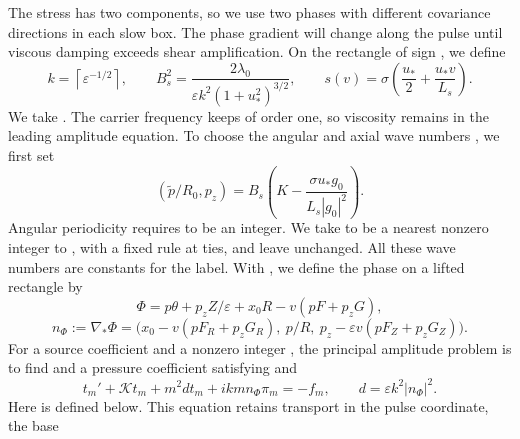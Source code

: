 The stress has two components, so we use two phases with different covariance directions
in each slow box. The phase gradient will change along the pulse until viscous damping
exceeds shear amplification. On the rectangle of sign , we define
\begin{equation}
k=\left\lceil\varepsilon^{-1/2}\right\rceil,\qquad
B_s^2=\frac{2\lambda_0}{\varepsilon k^2(1+u_*^2)^{3/2}},\qquad
s(v)=\sigma\left(\frac{u_*}{2}+\frac{u_*v}{L_s}\right).
\tag{7.2}\label{eq:7.2}
\end{equation}
We take . The carrier frequency  keeps  of order one, so viscosity remains in the
leading amplitude equation. To choose the angular and axial wave numbers , we first set
\[
(\widetilde p/R_0,p_z)=B_s\left(K-\frac{\sigma u_*g_0}{L_s|g_0|^2}\right).
\]
Angular periodicity requires  to be an integer. We take  to be a nearest nonzero integer
to , with a fixed rule at ties, and leave  unchanged. All these wave numbers are constants
for the label. With , we define the phase on a lifted rectangle by
\begin{equation}
\Phi=p\theta+p_zZ/\varepsilon+x_0R-v(pF+p_zG),
\tag{7.3}\label{eq:7.3}
\end{equation}
\begin{equation}
n_\Phi:=\nabla_*\Phi=\bigl(x_0-v(pF_R+p_zG_R),\ p/R,\ p_z-\varepsilon v(pF_Z+p_zG_Z)\bigr).
\tag{7.4}\label{eq:7.4}
\end{equation}
For a source coefficient  and a nonzero integer , the principal amplitude problem
is to find  and a pressure coefficient  satisfying  and
\begin{equation}
t_m'+\mathcal Kt_m+m^2dt_m+ikmn_\Phi\pi_m=-f_m,
\qquad d=\varepsilon k^2|n_\Phi|^2.
\tag{7.5}\label{eq:7.5}
\end{equation}
Here  is defined below. This equation retains transport in the pulse coordinate, the base
